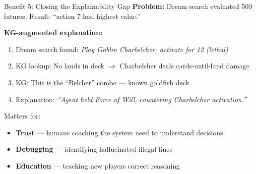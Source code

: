 \documentclass[aspectratio=169, 11pt]{beamer}
\begin{document}
\begin{frame}{Benefit 5: Closing the Explainability Gap}
  \textbf{Problem:} Dream search evaluated 500 futures. Result: ``action 7 had highest value.''

  \vspace{0.3cm}
  \textbf{KG-augmented explanation:}
  \begin{enumerate}\small
    \item Dream search found: \textit{Play Goblin Charbelcher, activate for 12 (lethal)}
    \item KG lookup: No lands in deck $\Rightarrow$ Charbelcher deals cards-until-land damage
    \item KG: This is the ``Belcher'' combo --- known goldfish deck
    \item Explanation: \textit{``Agent held Force of Will, countering Charbelcher activation.''}
  \end{enumerate}

  \vspace{0.3cm}
  Matters for:
  \begin{itemize}
    \item \textbf{Trust} --- humans coaching the system need to understand decisions
    \item \textbf{Debugging} --- identifying hallucinated illegal lines
    \item \textbf{Education} --- teaching new players correct reasoning
  \end{itemize}
\end{frame}
\end{document}
